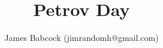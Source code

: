 \documentclass{article}
\begin{document}
\author{James Babcock (jimrandomh@gmail.com)}
\title{Petrov Day}





\end{document}
